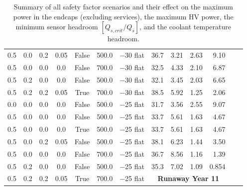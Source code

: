 \begin{table}[ht]
\begin{centering}
{\begin{tabular}{|ccccc|cc|rrrr|r|r|}
0.5     &     0.0 &   0.2 &  0.05 & False & 500.0 &  $-$30 flat &      36.7 &    3.21 &      2.63 &       9.10 \\
0.5     &     0.0 &   0.0 &   0.0 & False & 700.0 &  $-$30 flat &      32.5 &    4.33 &      2.10 &       6.87 \\
0.5     &     0.2 &   0.0 &   0.0 & False & 500.0 &  $-$30 flat &      32.1 &    3.45 &      2.03 &       6.65 \\
0.5     &     0.2 &   0.2 &  0.05 &  True & 700.0 &  $-$30 flat &      38.5 &    5.92 &      1.25 &       2.06 \\ \hline
0.0     &     0.0 &   0.0 &   0.0 & False & 500.0 &  $-$25 flat &      31.7 &    3.56 &      2.55 &       9.07 \\
0.5     &     0.0 &   0.0 &   0.0 & False & 500.0 &  $-$25 flat &      33.7 &    5.61 &      1.63 &       4.67 \\
0.5     &     0.0 &   0.0 &   0.0 &  True & 500.0 &  $-$25 flat &      33.7 &    5.61 &      1.63 &       4.67 \\
0.5     &     0.0 &   0.2 &  0.05 & False & 500.0 &  $-$25 flat &      38.1 &    6.23 &      1.44 &       3.50 \\
0.5     &     0.0 &   0.0 &   0.0 & False & 700.0 &  $-$25 flat &      36.7 &    8.56 &      1.16 &       1.39 \\
0.5     &     0.2 &   0.0 &   0.0 & False & 500.0 &  $-$25 flat &      35.3 &    7.02 &      1.09 &      0.854 \\
0.5     &     0.2 &   0.2 &  0.05 &  True & 700.0 &  $-$25 flat &     \multicolumn{4}{c|}{\bf Runaway Year 11} \\
\hline\end{tabular}
} %
\caption{Summary of all safety factor scenarios and their effect on the maximum power in the
endcaps (excluding services), the maximum HV power, the minimum sensor headroom $[Q_{s,crit}/Q_s]$, and the coolant temperature headroom.}
\label{detailed_safety_table}
\end{centering}
\end{table}
